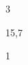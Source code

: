 \begin{Solution}{22}
\end{Solution}
\begin{Solution}{23}
\end{Solution}
\begin{Solution}{24}
\end{Solution}
\begin{Solution}{25}
\end{Solution}
\begin{Solution}{26}
\end{Solution}
\begin{Solution}{27}
\end{Solution}
\begin{Solution}{28}
\end{Solution}
\begin{Solution}{29}
3
\end{Solution}
\begin{Solution}{30}
15,7
\end{Solution}
\begin{Solution}{31}
1
\end{Solution}
